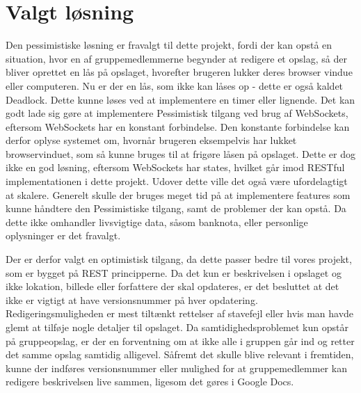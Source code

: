 \section{Valgt løsning}\label{sec:chosen_solution}
Den pessimistiske løsning er fravalgt til dette projekt, fordi der kan opstå en situation, hvor en af gruppemedlemmerne begynder at redigere et opslag, så der bliver oprettet en lås på opslaget, hvorefter brugeren lukker deres browser vindue eller computeren. Nu er der en lås, som ikke kan låses op - dette er også kaldet Deadlock\cite{deadlock}. Dette kunne løses ved at implementere en timer eller lignende. 
Det kan godt lade sig gøre at implementere Pessimistisk tilgang ved brug af WebSockets\cite{websockets}, eftersom WebSockets har en konstant forbindelse. Den konstante forbindelse kan derfor oplyse systemet om, hvornår brugeren eksempelvis har lukket browservinduet, som så kunne bruges til at frigøre låsen på opslaget. Dette er dog ikke en god løsning, eftersom WebSockets har states, hvilket går imod RESTful implementationen i dette projekt. Udover dette ville det også være ufordelagtigt at skalere.
Generelt skulle der bruges meget tid på at implementere features som kunne håndtere den Pessimistiske tilgang, samt de problemer der kan opstå. Da dette ikke omhandler livsvigtige data, såsom banknota, eller personlige oplysninger er det fravalgt. 

Der er derfor valgt en optimistisk tilgang, da dette passer bedre til vores projekt, som er bygget på REST principperne. Da det kun er beskrivelsen i opslaget og ikke lokation, billede eller forfattere der skal opdateres, er det besluttet at det ikke er vigtigt at have versionsnummer på hver opdatering. Redigeringsmuligheden er mest tiltænkt rettelser af stavefejl eller hvis man havde glemt at tilføje nogle detaljer til opslaget. Da samtidighedsproblemet kun opstår på gruppeopslag, er der en forventning om at ikke alle i gruppen går ind og retter det samme opslag samtidig alligevel. Såfremt det skulle blive relevant i fremtiden, kunne der indføres versionsnummer eller mulighed for at gruppemedlemmer kan redigere beskrivelsen live sammen, ligesom det gøres i Google Docs. \cite{googledocs}
